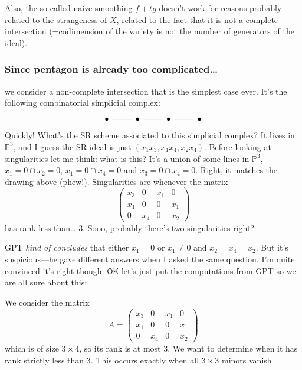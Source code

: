 Also, the so-called naive smoothing \(f+tg\) doesn't work for reasons probably related to the strangeness of \(X\), related to the fact that it is not a complete intersection (=codimension of the variety is not the number of generators of the ideal).

\subsubsection{Since pentagon is already too complicated…}

we consider a non-complete intersection that is the simplest case ever. It's the following combinatorial simplicial complex:
\[\begin{tikzcd}
	\bullet\arrow[r,no head]&\bullet\arrow[r,no head]&\bullet\arrow[r,no head]&\bullet
\end{tikzcd}\]
Quickly! What's the SR scheme associated to this simplicial complex? It lives in \(\mathbb{P}^3\), and I guess the SR ideal is just \((x_1x_3,x_1x_4,x_2x_4)\). Before looking at singularities let me think: what is this? It's a union of some lines in \(\mathbb{P}^3\), \(x_1=0 \cap x_2=0\), \(x_1=0 \cap x_4=0\) and \(x_3=0 \cap x_4=0\). Right, it matches the drawing above (phew!). Singularities are whenever the matrix
 \[\begin{pmatrix} x_3&0&x_1&0\\x_1&0&0&x_1\\0&x_4&0&x_2 \end{pmatrix} \]
has rank less than… 3. Sooo, probably there's two singularities right?

GPT \textit{kind of concludes} that either \(x_1=0\) or \(x_1\neq 0\) and \(x_2=x_4=x_2\). But it's suspicious---he gave different answers when I asked the same question. I'm quite convinced it's right though. \(\mathsf{OK}\) let's just put the computations from GPT so we are all sure about this:

We consider the matrix
\[
A = \begin{pmatrix} 
x_3 & 0   & x_1 & 0 \\
x_1 & 0   & 0   & x_1 \\
0   & x_4 & 0   & x_2 
\end{pmatrix}
\]
which is of size $3 \times 4$, so its rank is at most 3. We want to determine when it has rank strictly less than 3. This occurs exactly when all $3 \times 3$ minors vanish.

